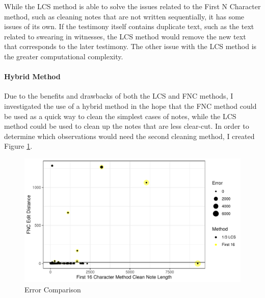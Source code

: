 \documentclass[print]{nuthesis}
\begin{document}
While the LCS method is able to solve the issues related to the First N Character method, such as cleaning notes that are not written sequentially, it has some issues of its own.
If the testimony itself contains duplicate text, such as the text related to swearing in witnesses, the LCS method would remove the new text that corresponds to the later testimony.
The other issue with the LCS method is the greater computational complexity.

\hypertarget{hybrid-method}{%
\paragraph{Hybrid Method}\label{hybrid-method}}

Due to the benefits and drawbacks of both the LCS and FNC methods, I investigated the use of a hybrid method in the hope that the FNC method could be used as a quick way to clean the simplest cases of notes, while the LCS method could be used to clean up the notes that are less clear-cut.
In order to determine which observations would need the second cleaning method, I created Figure \ref{fig:errorplot}.

\begin{figure}

{\centering \includegraphics[width=\linewidth]{thesis_files/figure-latex/errorplot-1} 

}

\caption{Error Comparison}\label{fig:errorplot}
\end{figure}
\end{document}
